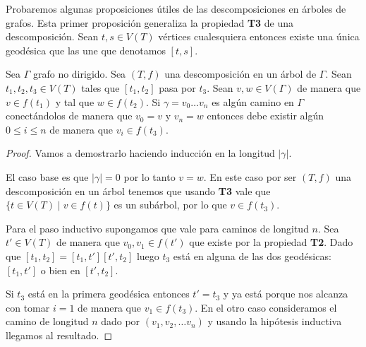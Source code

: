 \documentclass[tesis.tex]{subfiles}
\begin{document}
	


Probaremos algunas proposiciones útiles de las descomposiciones en árboles de grafos.
Esta primer proposición generaliza la propiedad \textbf{T3} de una descomposición.
Sean $t,s \in V(T)$ vértices cualesquiera entonces existe una única geodésica que las une que denotamos $[t,s]$.
\begin{prop}\label{prop-camino-desc}
	Sea $\Gamma$ grafo no dirigido.
	Sea $(T,f)$ una descomposición en un árbol de $\Gamma$.
	Sean $t_{1},t_{2},t_{3} \in V(T)$ tales que $[t_1,t_2]$ pasa por $t_{3}$.
	Sean $v,w \in V(\Gamma)$ de manera que $v \in f(t_{1})$ y tal que $w \in f(t_{2})$.
	Si $\gamma = v_0 \dots v_n$ es algún camino en $\Gamma$ conectándolos de manera que $v_{0}=v$ y $v_{n} = w$	
	entonces debe existir algún $ 0 \le i \le n$ de manera que $v_i \in f(t_{3})$. 
\end{prop}

\begin{proof}	
	Vamos a demostrarlo haciendo inducción en la longitud $|\gamma|$.
	 
	El caso base es que $|\gamma| = 0$ por lo tanto $v=w$. 
	En este caso por ser $(T,f)$ una descomposición en un árbol tenemos que usando \textbf{T3} vale que $\{  t \in V(T) \mid v \in f(t) \}$ es un subárbol, por lo que $v \in f(t_{3})$.
	
	Para el paso inductivo supongamos que vale para caminos de longitud $n$.
	Sea $t' \in V(T)$ de manera que $v_{0}, v_{1} \in f(t')$ que existe por la propiedad \textbf{T2}.
	Dado que 
	$[t_{1}, t_{2}] = [t_{1}, t'][t',t_{2}]$
	luego $t_{3}$ está en alguna de las dos geodésicas: $[t_{1},t']$ o bien en  $[t',t_{2}]$.
	
	Si $t_{3}$ está en la primera geodésica entonces $t' = t_{3}$ y ya está porque nos alcanza con tomar $i=1$ de manera que $v_1 \in f(t_{3})$.
	En el otro caso consideramos el camino de longitud $n$ dado por $(v_1, v_2, \dots v_n)$ y usando la hipótesis inductiva llegamos al resultado.	
\end{proof}
\end{document}
